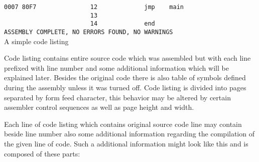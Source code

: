 \begin{code}[h]
                        {\color{highlight_lst_address}\verb'0007'}{\color{highlight_lst_code}\verb' 80F7'}{\color{highlight_lst_line}\verb'               12'}\verb'             '{\color{highlight_instruction}\verb'jmp'}\verb'    '{\color{highlight_constant}\verb'main'}\\
                        {\color{highlight_lst_line}\verb'                        13'}\\
                        {\color{highlight_lst_line}\verb'                        14'}\verb'             '{\color{highlight_directive}\verb'end'}\\
                        {\color{highlight_lst_msg}\verb'ASSEMBLY COMPLETE,'}\verb' NO ERRORS FOUND, NO WARNINGS'\\
                        \caption{A simple code listing}
                \end{code}
                Code listing contains entire source code which was assembled but with each line prefixed with line number and some additional information which will be explained later. Besides the original code there is also table of symbols defined during the assembly unless it was turned off. Code listing is divided into pages separated by form feed character, this behavior may be altered by certain assembler control sequences as well as page height and width.

                Each line of code listing which contains original source code line may contain beside line number also some additional information regarding the compilation of the given line of code. Such a additional information might look like this and is composed of these parts:

